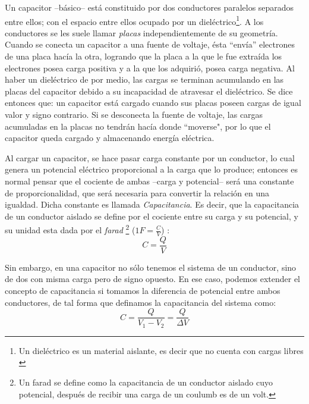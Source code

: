 \documentclass[letterpaper, 11 pt]{article}
\begin{document}
\begin{multicols}{2}
Un capacitor --básico-- está constituido por dos conductores paralelos separados entre ellos; con el espacio entre ellos ocupado por un dieléctrico\footnote{Un dieléctrico es un material aislante, es decir que no cuenta con cargas libres \cite{finn1999}}. A los conductores se les suele llamar \textit{placas} independientemente de su geometría. Cuando se conecta un capacitor a una fuente de voltaje, ésta ``envía'' electrones de una placa hacía la otra, logrando que la placa a la que le fue extraída los electrones posea carga positiva y a la que los adquirió, posea carga negativa. Al haber un dieléctrico de por medio, las cargas se terminan acumulando en las placas del capacitor debido a su incapacidad de atravesar el dieléctrico. Se dice entonces que: un capacitor está cargado cuando sus placas poseen cargas de igual valor y signo contrario. 
Si se desconecta la fuente de voltaje, las cargas acumuladas en la placas no tendrán hacía donde ``moverse", por lo que el capacitor queda cargado y almacenando energía eléctrica.




Al cargar un capacitor, se hace pasar carga constante por un conductor, lo cual genera un potencial eléctrico proporcional a la carga que lo produce; entonces es normal pensar que el cociente de ambas --carga y potencial-- será una constante de proporcionalidad, que será necesaria para convertir la relación en una igualdad. Dicha constante es llamada \textit{Capacitancia}. Es decir, que la capacitancia de un conductor aislado se define por el cociente entre su carga y su potencial, y su unidad esta dada por el \textit{farad}  \footnote{Un farad se define como la capacitancia de un conductor aislado cuyo potencial, después de recibir una carga de un coulumb es de un volt.} ($1F=\frac{C}{V}$) \cite{finn1999}:
\begin{equation}
    C=\frac{Q}{V}
\end{equation}{}


Sin embargo, en una capacitor no sólo tenemos el sistema de un conductor, sino de dos con misma carga pero de signo opuesto. En ese caso, podemos extender el concepto de capacitancia si tomamos la diferencia de potencial entre ambos conductores, de tal forma que definamos la capacitancia del sistema como:  
\begin{equation}
    C=\frac{Q}{V_{1}-V_{2}} = \frac{Q}{\Delta V}
\end{equation}{}



\end{multicols}
\end{document}
